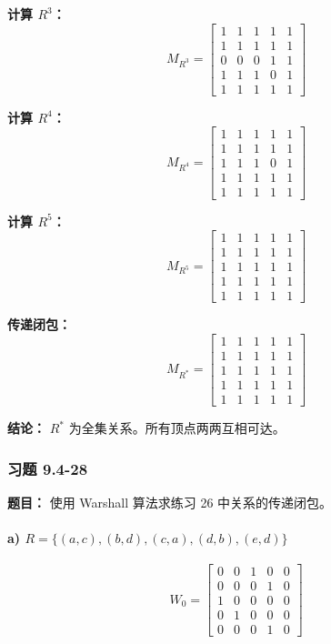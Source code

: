 \documentclass[11pt,UTF8]{article}
\begin{document}
\textbf{计算 $R^3$：}
\[
M_{R^3} = \begin{bmatrix}
1 & 1 & 1 & 1 & 1 \\
1 & 1 & 1 & 1 & 1 \\
0 & 0 & 0 & 1 & 1 \\
1 & 1 & 1 & 0 & 1 \\
1 & 1 & 1 & 1 & 1
\end{bmatrix}
\]

\textbf{计算 $R^4$：}
\[
M_{R^4} = \begin{bmatrix}
1 & 1 & 1 & 1 & 1 \\
1 & 1 & 1 & 1 & 1 \\
1 & 1 & 1 & 0 & 1 \\
1 & 1 & 1 & 1 & 1 \\
1 & 1 & 1 & 1 & 1
\end{bmatrix}
\]

\textbf{计算 $R^5$：}
\[
M_{R^5} = \begin{bmatrix}
1 & 1 & 1 & 1 & 1 \\
1 & 1 & 1 & 1 & 1 \\
1 & 1 & 1 & 1 & 1 \\
1 & 1 & 1 & 1 & 1 \\
1 & 1 & 1 & 1 & 1
\end{bmatrix}
\]

\textbf{传递闭包：}
\[
M_{R^*} = \begin{bmatrix}
1 & 1 & 1 & 1 & 1 \\
1 & 1 & 1 & 1 & 1 \\
1 & 1 & 1 & 1 & 1 \\
1 & 1 & 1 & 1 & 1 \\
1 & 1 & 1 & 1 & 1
\end{bmatrix}
\]

\textbf{结论：} $R^*$ 为全集关系。所有顶点两两互相可达。

\subsubsection*{习题 9.4-28}
\textbf{题目：} 使用 Warshall 算法求练习 26 中关系的传递闭包。

\paragraph{a) $R = \{(a,c),(b,d),(c,a),(d,b),(e,d)\}$}

\[
W_0 = \begin{bmatrix}
0 & 0 & 1 & 0 & 0 \\
0 & 0 & 0 & 1 & 0 \\
1 & 0 & 0 & 0 & 0 \\
0 & 1 & 0 & 0 & 0 \\
0 & 0 & 0 & 1 & 0
\end{bmatrix}
\]
\end{document}
